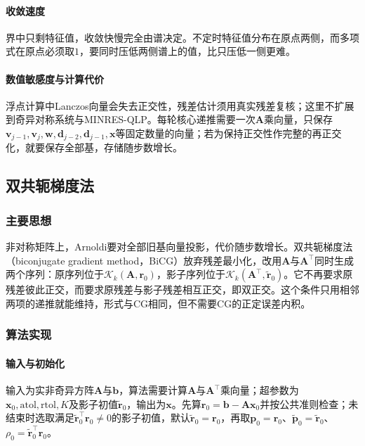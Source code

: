 \paragraph{收敛速度}
界中只剩特征值，收敛快慢完全由谱决定。不定时特征值分布在原点两侧，而多项式在原点必须取$1$，要同时压低两侧谱上的值，比只压低一侧更难。

\paragraph{数值敏感度与计算代价}
浮点计算中Lanczos向量会失去正交性，残差估计须用真实残差复核；这里不扩展到奇异对称系统与MINRES-QLP。每轮核心递推需要一次$\bm A$乘向量，只保存$\bm v_{j-1},\bm v_j,\bm w,\bm d_{j-2},\bm d_{j-1},\bm x$等固定数量的向量；若为保持正交性作完整的再正交化，就要保存全部基，存储随步数增长。

\subsection{双共轭梯度法}
\label{sec:ls-bicg}

\subsubsection{主要思想}

非对称矩阵上，Arnoldi要对全部旧基向量投影，代价随步数增长。双共轭梯度法（biconjugate gradient method，BiCG）放弃残差最小化，改用$\bm A$与$\bm A^\top$同时生成两个序列：原序列位于$\mathcal K_k(\bm A,\bm r_0)$，影子序列位于$\mathcal K_k(\bm A^\top,\widetilde{\bm r}_0)$。它不再要求原残差彼此正交，而要求原残差与影子残差相互正交，即双正交。这个条件只用相邻两项的递推就能维持，形式与CG相同，但不需要CG的正定误差内积。

\subsubsection{算法实现}

\paragraph{输入与初始化}
输入为实非奇异方阵$\bm A$与$\bm b$，算法需要计算$\bm A$与$\bm A^\top$乘向量；超参数为$\bm x_0,\mathrm{atol},\mathrm{rtol},K$及影子初值$\widetilde{\bm r}_0$，输出为$\bm x$。先算$\bm r_0=\bm b-\bm A\bm x_0$并按公共准则检查；未结束时选取满足$\widetilde{\bm r}_0^\top\bm r_0\ne0$的影子初值，默认$\widetilde{\bm r}_0=\bm r_0$，再取$\bm p_0=\bm r_0$、$\widetilde{\bm p}_0=\widetilde{\bm r}_0$、$\rho_0=\widetilde{\bm r}_0^\top\bm r_0$。

